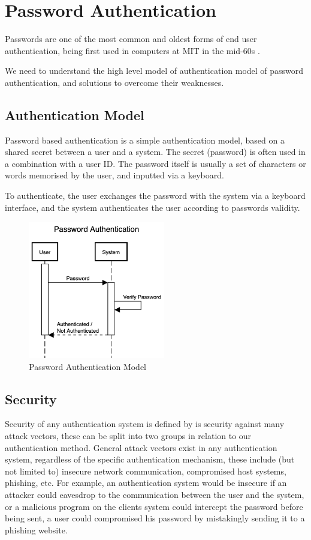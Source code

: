\section{Password Authentication}

Passwords are one of the most common and oldest forms of end user authentication, being first used in computers at MIT in the mid-60s \cite{mcmillan2012password}.

We need to understand the high level model of authentication model of password authentication, and solutions to overcome their weaknesses.

\subsection{Authentication Model}

Password based authentication is a simple authentication model, based on a shared secret between a user and a system. 
The secret (password) is often used in a combination with a user ID. 
The password itself is usually a set of characters or words memorised by the user, and inputted via a keyboard.

To authenticate, the user exchanges the password with the system via a keyboard interface, and the system authenticates the user according to passwords validity.

\begin{figure}[h]
	\centering
	\includegraphics[height=6cm]{images/password-authentication}
	\caption{Password Authentication Model}
	\label{fig:password-authentication}
\end{figure}


\subsection{Security}

Security of any authentication system is defined by is security against many attack vectors, these can be split into two groups in relation to our authentication method.
General attack vectors exist in any authentication system, regardless of the specific authentication mechanism, these include (but not limited to) insecure network communication, compromised host systems, phishing, etc. For example, an authentication system would be insecure if an attacker could eavesdrop to the communication between the user and the system, or a malicious program on the clients system could intercept the password before being sent, a user could compromised his password by mistakingly sending it to a phishing website.

